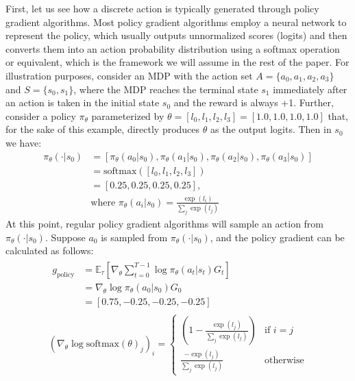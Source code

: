 \documentclass[letterpaper]{article}
\begin{document}
First, let us see how a discrete action is typically generated through policy gradient algorithms. Most policy gradient algorithms employ a neural network to represent the policy, which usually outputs unnormalized scores (logits) and then converts them into an action probability distribution using a softmax operation or equivalent, which is the framework we will assume in the rest of the paper. For illustration purposes, consider an MDP with the action set $A=\{a_0, a_1, a_2, a_3\}$ and $S=\{s_0, s_1\}$, where the MDP reaches the terminal state $s_1$ immediately after an action is taken in the initial state $s_0$ and the reward is always +1. Further, consider a policy $\pi_{\theta}$ parameterized by $\theta = [l_0, l_1, l_2, l_3]=[1.0,1.0,1.0,1.0]$ that, for the sake of this example, directly produces $\theta$ as the output logits. Then in $s_0$ we have:
\begin{align}
    \pi_{\theta}(\cdot \vert s_0)&= [\pi_{\theta}(a_0|s_0), \pi_{\theta}(a_1|s_0), \pi_{\theta}(a_2|s_0), \pi_{\theta}(a_3|s_0)]  \nonumber \\
    &=\text{softmax}([l_0, l_1, l_2, l_3])  \label{eq:softmax_logits2}\\
    &=[0.25, 0.25, 0.25, 0.25],  \nonumber\\
    &\text{where }\pi_{\theta}(a_i|s_0) = \frac{\exp(l_i)}{\sum_j \exp(l_j)} \nonumber
\end{align}
At this point, regular policy gradient algorithms will sample an action from $\pi_{\theta}(\cdot \vert s_0)$. Suppose $a_0$ is sampled from $\pi_{\theta}(\cdot \vert s_0)$, and the policy gradient can be calculated as follows:
\begin{align*}
    \begin{aligned}
g_{\text{policy}} &=  \mathbb{E}_{\tau}\left [\nabla_{\theta} \sum_{t=0}^{T-1} \log\pi_{\theta}(a_t|s_t)G_t \right] \\
    &=\nabla_{\theta}\log\pi_{\theta}(a_0|s_0)G_0 \\
    &= [ 0.75, -0.25, -0.25, -0.25]
    \end{aligned} \\
    (\nabla_{\theta}\log \text{softmax}(\theta)_j)_i = \begin{cases}
 (1 -  \frac{\exp(l_j)}{\sum_j \exp(l_j)}) &\text{if $i=j$}\\
 \frac{-\exp(l_j)}{\sum_j \exp(l_j)} &\text{otherwise}
\end{cases}
\end{align*}
\end{document}
